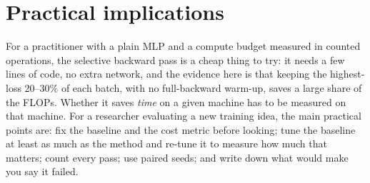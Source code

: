 \section{Practical implications}
For a practitioner with a plain MLP and a compute budget measured in counted operations, the selective backward pass is a cheap thing to try: it needs a few lines of code, no extra network, and the evidence here is that keeping the highest-loss $20$--$30\%$ of each batch, with no full-backward warm-up, saves a large share of the FLOPs. Whether it saves \emph{time} on a given machine has to be measured on that machine. For a researcher evaluating a new training idea, the main practical points are: fix the baseline and the cost metric before looking; tune the baseline at least as much as the method and re-tune it to measure how much that matters; count every pass; use paired seeds; and write down what would make you say it failed.
